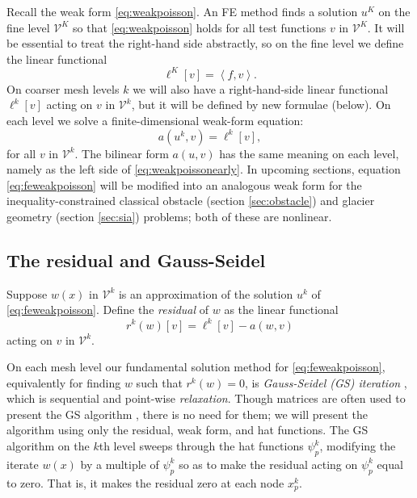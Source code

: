 \documentclass[letterpaper,final,12pt,reqno]{amsart}
\newcommand{\ip}[2]{\left<#1,#2\right>}
\numberwithin{equation}{section}
\numberwithin{figure}{section}
\numberwithin{table}{section}
\begin{document}
Recall the weak form \eqref{eq:weakpoisson}.  An FE method finds a solution $u^K$ on the fine level $\mathcal{V}^K$ so that \eqref{eq:weakpoisson} holds for all test functions $v$ in $\mathcal{V}^K$.  It will be essential to treat the right-hand side abstractly, so on the fine level we define the linear functional
\begin{equation}
  \ell^K[v] = \ip{f}{v}.  \label{eq:rhsfine}
\end{equation}
On coarser mesh levels $k$ we will also have a right-hand-side linear functional $\ell^k[v]$ acting on $v$ in $\mathcal{V}^k$, but it will be defined by new formulae (below).  On each level we solve a finite-dimensional weak-form equation:
\begin{equation}
  a(u^k,v) = \ell^k[v],  \label{eq:feweakpoisson}
\end{equation}
for all $v$ in $\mathcal{V}^k$.  The bilinear form $a(u,v)$ has the same meaning on each level, namely as the left side of \eqref{eq:weakpoissonearly}.  In upcoming sections, equation \eqref{eq:feweakpoisson} will be modified into an analogous weak form for the inequality-constrained classical obstacle (section \ref{sec:obstacle}) and glacier geometry (section \ref{sec:sia}) problems; both of these are nonlinear.

\subsection*{The residual and Gauss-Seidel}  Suppose $w(x)$ in $\mathcal{V}^k$ is an approximation of the solution $u^k$ of \eqref{eq:feweakpoisson}.  Define the \emph{residual} of $w$ as the linear functional
\begin{equation}
  r^k(w)[v] = \ell^k[v] - a(w,v)  \label{eq:residual}
\end{equation}
acting on $v$ in $\mathcal{V}^k$.

On each mesh level our fundamental solution method for \eqref{eq:feweakpoisson}, equivalently for finding $w$ such that $r^k(w)=0$, is \emph{Gauss-Seidel (GS) iteration} \cite{Greenbaum1997}, which is sequential and point-wise \emph{relaxation}.  Though matrices are often used to present the GS algorithm \cite[for example]{Bueler2021,Greenbaum1997}, there is no need for them; we will present the algorithm using only the residual, weak form, and hat functions.  The GS algorithm on the $k$th level sweeps through the hat functions $\psi_p^k$, modifying the iterate $w(x)$ by a multiple of $\psi_p^k$ so as to make the residual acting on $\psi_p^k$ equal to zero.  That is, it makes the residual zero at each node $x_p^k$.
\end{document}
